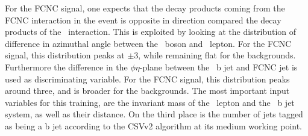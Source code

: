    
   For the FCNC signal, one expects that the decay products coming from the FCNC interaction in the event is opposite in direction compared the decay products of the \SM\ interaction. This is exploited by looking at the distribution of difference in azimuthal angle between the  \PZ\ boson and  \PW\ lepton. For the FCNC signal, this distribution peaks at $\pm 3$, while remaining flat for the backgrounds. Furthermore the difference in the $\phi\eta$-plane between the \SM\ b jet and FCNC jet is used as discriminating variable. For the FCNC signal, this distribution peaks around three, and is broader for the backgrounds.  The most important input variables for this training, are the invariant mass of the \PW\ lepton and the \SM\ b jet system, as well as their distance. On the third place is the number of jets tagged as being a b jet according to the CSVv2 algorithm at its medium working point. 
